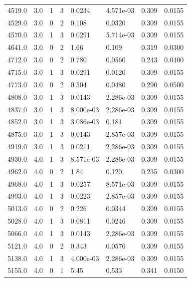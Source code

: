 \documentclass[preview]{standalone}
\begin{document}
{{{{{\begin{tabular}{L{1.2cm}C{1.2cm} C{0.3cm}C{0.5cm} C{1.4cm}C{1.4cm} C{1.4cm}C{1.4cm}}
  4519.0  &   3.0  & 1     &  3 &  0.0234  & 4.571e-03  & 0.309 &  0.0155   \\ 
  4529.0  &   3.0  & 0     &  2 &  0.108  & 0.0320  & 0.309 &  0.0155   \\ 
  4570.0  &   3.0  & 1     &  3 &  0.0291  & 5.714e-03  & 0.309 &  0.0155   \\ 
  4641.0  &   3.0  & 0     &  2 &  1.66  & 0.109  & 0.319 &  0.0300   \\ 
  4712.0  &   3.0  & 0     &  2 &  0.780  & 0.0560  & 0.243 &  0.0400   \\ 
  4715.0  &   3.0  & 1     &  3 &  0.0291  & 0.0120  & 0.309 &  0.0155   \\ 
  4773.0  &   3.0  & 0     &  2 &  0.504  & 0.0480  & 0.290 &  0.0500   \\ 
  4808.0  &   3.0  & 1     &  3 &  0.0143  & 2.286e-03  & 0.309 &  0.0155   \\ 
  4837.0  &   3.0  & 1     &  3 &  8.000e-03  & 2.286e-03  & 0.309 &  0.0155   \\ 
  4852.0  &   3.0  & 1     &  3 &  3.086e-03  & 0.181  & 0.309 &  0.0155   \\ 
  4875.0  &   3.0  & 1     &  3 &  0.0143  & 2.857e-03  & 0.309 &  0.0155   \\ 
  4919.0  &   3.0  & 1     &  3 &  0.0211  & 2.286e-03  & 0.309 &  0.0155   \\ 
  4930.0  &   4.0  & 1     &  3 &  8.571e-03  & 2.286e-03  & 0.309 &  0.0155   \\ 
  4962.0  &   4.0  & 0     &  2 &  1.84  & 0.120  & 0.235 &  0.0300   \\ 
  4968.0  &   4.0  & 1     &  3 &  0.0257  & 8.571e-03  & 0.309 &  0.0155   \\ 
  4993.0  &   4.0  & 1     &  3 &  0.0223  & 2.857e-03  & 0.309 &  0.0155   \\ 
  5013.0  &   4.0  & 0     &  2 &  0.226  & 0.0344  & 0.309 &  0.0155   \\ 
  5028.0  &   4.0  & 1     &  3 &  0.0811  & 0.0246  & 0.309 &  0.0155   \\ 
  5066.0  &   4.0  & 1     &  3 &  0.0143  & 2.286e-03  & 0.309 &  0.0155   \\ 
  5121.0  &   4.0  & 0     &  2 &  0.343  & 0.0576  & 0.309 &  0.0155   \\ 
  5138.0  &   4.0  & 1     &  3 &  4.000e-03  & 2.286e-03  & 0.309 &  0.0155   \\ 
  5155.0  &   4.0  & 0     &  1 &  5.45  & 0.533  & 0.341 &  0.0150   \\ 

\end{tabular}}}}}}
\end{document}
